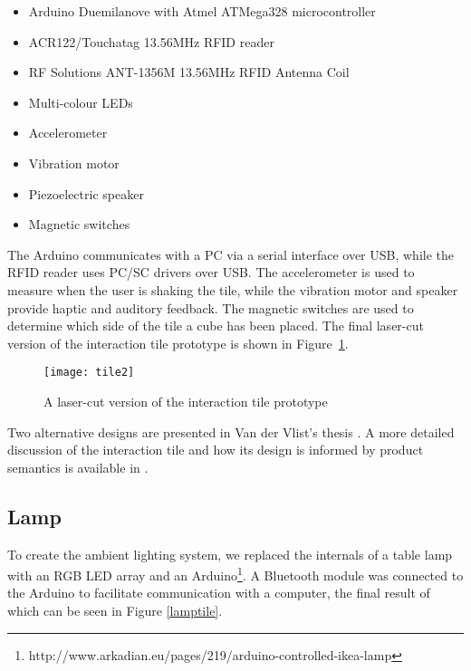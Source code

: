 \begin{itemize}
	\item Arduino Duemilanove with Atmel ATMega328 microcontroller
	\item ACR122/Touchatag 13.56MHz \ac{RFID} reader
	\item RF Solutions ANT-1356M 13.56MHz \ac{RFID} Antenna Coil
	\item Multi-colour LEDs
	\item Accelerometer 
	\item Vibration motor
	\item Piezoelectric speaker
	\item Magnetic switches
\end{itemize}

The Arduino communicates with a PC via a serial interface over USB, while the \ac{RFID} reader uses \ac{PC/SC} drivers over USB. The accelerometer is used to measure when the user is shaking the tile, while the vibration motor and speaker provide haptic and auditory feedback. The magnetic switches are used to determine which side of the tile a cube has been placed. The final laser-cut version of the interaction tile prototype is shown in \mbox{Figure \ref{tile2}}.

\begin{figure}[bth]
\centering
\texttt{[image: tile2]}
\caption{A laser-cut version of the interaction tile prototype}
\label{tile2}
\end{figure}

Two alternative designs are presented in Van der Vlist's thesis \cite{Bram}. A more detailed discussion of the interaction tile and how its design is informed by product semantics is available in \cite{VanderVlist2010}. 

\subsection{Lamp}
\label{Lamp}
To create the ambient lighting system, we replaced the internals of a table lamp with an RGB LED array and an Arduino\footnote{ http://www.arkadian.eu/pages/219/arduino-controlled-ikea-lamp}. A Bluetooth module was connected to the Arduino to facilitate communication with a computer, the final result of which can be seen in Figure \ref{lamptile}. 

